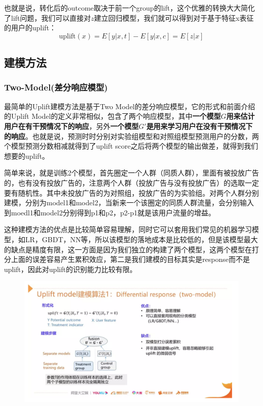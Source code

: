 \documentclass[12pt]{article}
\begin{document}
也就是说，转化后的outcome取决于前一个group的lift，这个优雅的转换大大简化了lift问题，我们可以直接对$z$建立回归模型，我们就可以得到对于基于特征x表征的用户的uplift：
$$
\text{uplift}(x) = E[y|x,t] - E[y|x,c] = E[z|x]
$$


\subsection{建模方法}
\subsubsection{Two-Model(差分响应模型)}
最简单的Uplift建模方法是基于Two Model的差分响应模型，它的形式和前面介绍的Uplift Model的定义非常相似，包含了两个响应模型，其中\textbf{一个模型$G$用来估计用户在有干预情况下的响应}，另外\textbf{一个模型$G'$是用来学习用户在没有干预情况下的响应}。也就是说，预测时时分别对实验组模型和对照组模型预测用户的分数，两个模型预测分数相减就得到了uplift score之后将两个模型的输出做差，就得到我们想要的uplift。

简单来说，就是训练2个模型，首先圈定一个人群（同质人群），里面有被投放广告的，也有没有投放广告的，注意两个人群（投放广告与没有投放广告）的选取一定要有随机性。其中未投放广告的为对照组，投放广告的为实验组。对两个人群分别建模，分别为model1和model2，当新来一个该圈定的同质人群流量，会分别输入到moedl1和model2分别得到p1和p2，p2-p1就是该用户流量的增益\cite{Understand_Uplift_Model_In_Ads}。

这种建模方法的优点是比较简单容易理解，同时它可以套用我们常见的机器学习模型，如LR，GBDT，NN等，所以该模型的落地成本是比较低的，但是该模型最大的缺点是精度有限，这一方面是因为我们独立的构建了两个模型，这两个模型在打分上面的误差容易产生累积效应，第二是我们建模的目标其实是response而不是uplift，因此对uplift的识别能力比较有限。

\begin{figure}[H]
    \centering
    \includegraphics[width=1\textwidth]{fig/CasualInference-Uplift-Model-Two-Model.png}
\end{figure}
\end{document}
